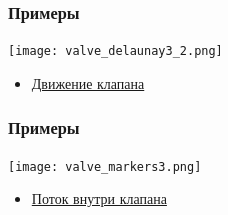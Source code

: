 \documentclass[14pt]{beamer}
\begin{document}
\begin{frame}
\frametitle{Примеры}
    \begin{center}
        \texttt{[image: valve\_delaunay3\_2.png]}
    \end{center}

\begin{itemize}
    \item[\MVRightarrow] \href{run:video/valve_delaunay3.avi}{Движение клапана}
\end{itemize}
\end{frame}

\begin{frame}
\frametitle{Примеры}
    \begin{center}
        \texttt{[image: valve\_markers3.png]}
    \end{center}

\begin{itemize}
    \item[\MVRightarrow] \href{run:video/valve_markers_better.avi}{Поток внутри клапана}
\end{itemize}
\end{frame}



\end{document}
